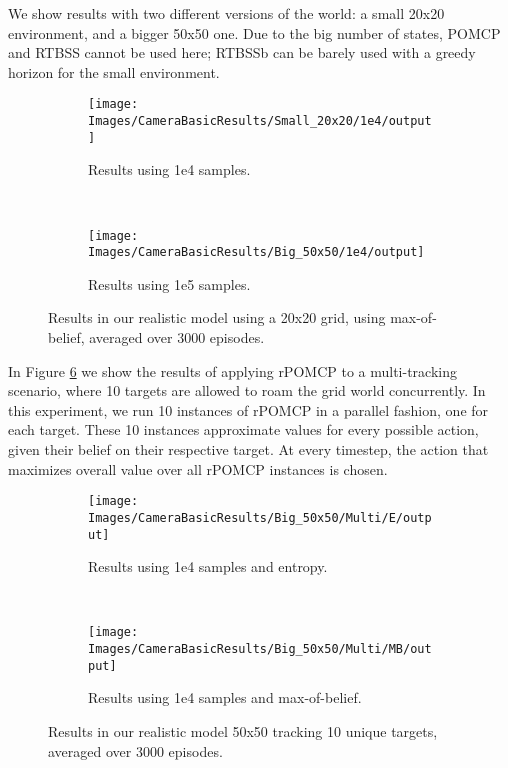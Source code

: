 We show results with two different versions of the world: a small 20x20 environment, and a bigger
50x50 one. Due to the big number of states, POMCP and RTBSS cannot be used here; RTBSSb can be
barely used with a greedy horizon for the small environment.

\begin{figure}[ht]
        \centering
        \begin{subfigure}[t]{0.45\textwidth}
                \texttt{[image: Images/CameraBasicResults/Small\_20x20/1e4/output]}
                \caption{Results using 1e4 samples.}
                \label{fig:cws4mb}
        \end{subfigure}%
        ~ %
        \begin{subfigure}[t]{0.45\textwidth}
                \texttt{[image: Images/CameraBasicResults/Big\_50x50/1e4/output]}
                \caption{Results using 1e5 samples.}
                \label{fig:cws5mb}
        \end{subfigure}
        \caption{Results in our realistic model using a 20x20 grid, using max-of-belief, averaged over 3000 episodes.}\label{fig:cwsmb}
\end{figure}

In Figure \ref{fig:cwb10} we show the results of applying rPOMCP to a multi-tracking scenario, where
10 targets are allowed to roam the grid world concurrently. In this experiment, we run 10 instances
of rPOMCP in a parallel fashion, one for each target. These 10 instances approximate values for
every possible action, given their belief on their respective target. At every timestep, the action that
maximizes overall value over all rPOMCP instances is chosen.

\begin{figure}[ht!]
        \centering
        \begin{subfigure}[t]{0.5\textwidth}
                \texttt{[image: Images/CameraBasicResults/Big\_50x50/Multi/E/output]}
                \caption{Results using 1e4 samples and entropy.}
                \label{fig:cwb4e10}
        \end{subfigure}%
        ~ %
        \begin{subfigure}[t]{0.5\textwidth}
                \texttt{[image: Images/CameraBasicResults/Big\_50x50/Multi/MB/output]}
                \caption{Results using 1e4 samples and max-of-belief.}
                \label{fig:cwb5mb10}
        \end{subfigure}
        \caption{Results in our realistic model 50x50 tracking 10 unique targets, averaged over 3000 episodes.}\label{fig:cwb10}
\end{figure}

